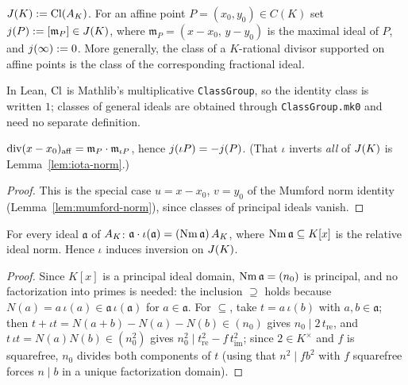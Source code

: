 \begin{definition}
\label{def:hypjac}
\leanok
{}
$J(K) := \operatorname{Cl}(A_{K})$. For an affine point $P = (x_0,y_0) \in C(K)$ set
$j(P) := [\mathfrak m_P] \in J(K)$, where $\mathfrak m_P = (x - x_0,\, y - y_0)$ is the
maximal ideal of $P$, and $j(\infty) := 0$. More generally, the class of a $K$-rational
divisor supported on affine points is the class of the corresponding fractional ideal.
\end{definition}

\begin{remark}[Formalization]
In Lean, $\operatorname{Cl}$ is Mathlib's multiplicative \texttt{ClassGroup}, so the identity class is
written $1$; classes of general ideals are obtained through \texttt{ClassGroup.mk0} and
need no separate definition.
\end{remark}

\begin{lemma}
\label{lem:aj-inverse}
\leanok
{}
$\operatorname{div}(x - x_0)_{\mathrm{aff}} = \mathfrak m_P \cdot \mathfrak m_{\iota P}$, hence
$j(\iota P) = -j(P)$. (That $\iota$ inverts \emph{all} of $J(K)$ is
Lemma~\ref{lem:iota-norm}.)
\end{lemma}
\begin{proof}
\leanok
This is the special case $u = x - x_0$, $v = y_0$ of the Mumford norm identity
(Lemma~\ref{lem:mumford-norm}), since classes of principal ideals vanish.
\end{proof}

\begin{lemma}
\label{lem:iota-norm}
\leanok
{}
For every ideal $\mathfrak a$ of $A_{K}$:
$\mathfrak a \cdot \iota(\mathfrak a) = (\operatorname{Nm} \mathfrak a)\,A_{K}$, where
$\operatorname{Nm} \mathfrak a \subseteq K[x]$ is the relative ideal norm. Hence $\iota$ induces
inversion on $J(K)$.
\end{lemma}
\begin{proof}
\leanok
Since $K[x]$ is a principal ideal domain, $\operatorname{Nm} \mathfrak a = (n_0)$ is principal, and no
factorization into primes is needed: the inclusion $\supseteq$ holds because
$N(a) = a\,\iota(a) \in \mathfrak a\,\iota(\mathfrak a)$ for $a \in \mathfrak a$. For
$\subseteq$, take $t = a\,\iota(b)$ with $a, b \in \mathfrak a$; then
$t + \iota t = N(a+b) - N(a) - N(b) \in (n_0)$ gives $n_0 \mid 2\,t_{\mathrm{re}}$, and
$t\,\iota t = N(a)N(b) \in (n_0^2)$ gives
$n_0^2 \mid t_{\mathrm{re}}^2 - f\,t_{\mathrm{im}}^2$; since $2 \in K^\times$ and $f$ is
squarefree, $n_0$ divides both components of $t$ (using that $n^2 \mid f b^2$ with $f$
squarefree forces $n \mid b$ in a unique factorization domain).
\end{proof}

